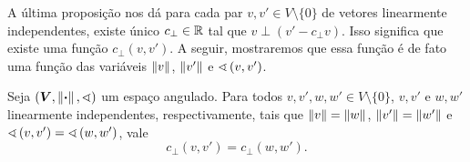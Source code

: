 A última proposição nos dá para cada par $v,v' \in V \setminus \{0\}$ de vetores linearmente independentes, existe único $c_{\perp} \in \mathbb{R}$ tal que $v \perp (v'-c_\perp v)$. Isso significa que existe uma função $c_{\perp}(v,v')$. A seguir, mostraremos que essa função é de fato uma função das variáveis $\left\Vert{v}\right\Vert$, $\left\Vert{v'}\right\Vert$ e $\sphericalangle\left({v},{v'}\right)$.

\begin{proposition}
\label{prop:geo.cperpfuncaonormaangulo}
Seja $(\bm V, \left\Vert{\bm{\cdot}}\right\Vert,\sphericalangle)$ um espaço angulado. Para todos $v,v',w,w' \in V \setminus \{0\}$, $v,v'$ e $w,w'$ linearmente independentes, respectivamente, tais que $\left\Vert{v}\right\Vert=\left\Vert{w}\right\Vert$, $\left\Vert{v'}\right\Vert=\left\Vert{w'}\right\Vert$ e $\sphericalangle\left({v},{v'}\right) = \sphericalangle\left({w},{w'}\right)$, vale
	\begin{equation*}
	c_{\perp}(v,v') = c_{\perp}(w,w').
	\end{equation*}
\end{proposition}
